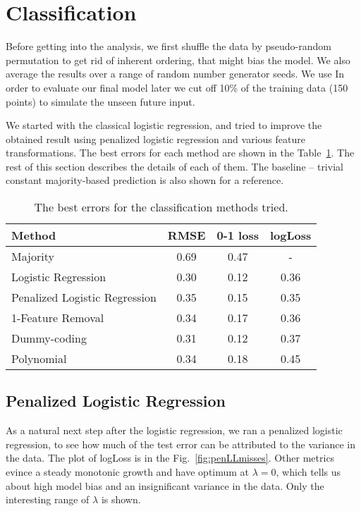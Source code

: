 \documentclass{article} %
\begin{document}
\section{Classification}

Before getting into the analysis, we first shuffle the data by pseudo-random permutation to get rid of inherent ordering, that might bias the model. We also average the results over a range of random number generator seeds. We use In order to evaluate our final model later we cut off 10\% of the training data (150 points) to simulate the unseen future input.

We started with the classical logistic regression, and tried to improve the obtained result using penalized logistic regression and various feature transformations. The best errors for each method are shown in the Table~\ref{tab:classification-errors}. The rest of this section describes the details of each of them. The baseline -- trivial constant majority-based prediction is also shown for a reference.
\begin{table}[h]
  \begin{center}
    \begin{tabular}{l|ccc}
      Method & RMSE & 0-1 loss & logLoss \\
      \hline
      Majority & 0.69 & 0.47 & - \\
      Logistic Regression & 0.30 & 0.12 & 0.36 \\
      Penalized Logistic Regression & 0.35 & 0.15 & 0.35  \\
      1-Feature Removal & 0.34 & 0.17 & 0.36 \\
      Dummy-coding & 0.31 & 0.12 & 0.37 \\
      Polynomial & 0.34 & 0.18 & 0.45
    \end{tabular}
    \caption{The best errors for the classification methods tried.}
    \label{tab:classification-errors}
  \end{center}
\end{table}

\subsection{Penalized Logistic Regression}
As a natural next step after the logistic regression, we ran a penalized logistic regression, to see how much of the test error can be attributed to the variance in the data. The plot of logLoss is in the Fig.~\ref{fig:penLLmisses}. Other metrics evince a steady monotonic growth and have optimum at $\lambda = 0$, which tells us about high model bias and an insignificant variance in the data. Only the interesting range of $\lambda$ is shown.
\end{document}
